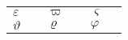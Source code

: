 \documentclass{article}
\newcommand*\s[1]{$#1$&\texttt{\string#1}}
\begin{document}
\thispagestyle{empty}
\begin{tabular}{l@{~}ll@{~}ll@{~}l}
\s\varepsilon & \s\varpi      & \s\varsigma  \\
\s\vartheta   &  \s\varrho  & \s\varphi
\end{tabular}
\end{document}
